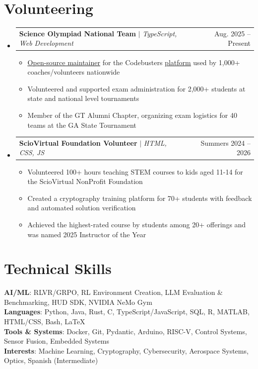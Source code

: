 \documentclass[letterpaper,11pt]{article}
\makeatletter
\newcommand{\resumeItem}[1]{
  \item[--]\small{
    {#1 \vspace{-2pt}}
  }
}
\newcommand{\resumeProjectHeading}[2]{
    \item
    \begin{tabular*}{0.97\textwidth}{l@{\extracolsep{\fill}}r}
      \small#1 & #2 \\
    \end{tabular*}\vspace{-7pt}
}
\newcommand{\resumeSubHeadingListStart}{\begin{itemize}[leftmargin=0.15in, label={}]}
\newcommand{\resumeSubHeadingListEnd}{\end{itemize}}
\newcommand{\resumeItemListStart}{\begin{itemize}}
\newcommand{\resumeItemListEnd}{\end{itemize}\vspace{-5pt}}
\makeatother
\begin{document}
\section{Volunteering}
    \resumeSubHeadingListStart
      \resumeProjectHeading
          {\textbf{Science Olympiad National Team} $|$ \emph{TypeScript, Web Development}}{Aug. 2025 -- Present}
          \resumeItemListStart
            \resumeItem{\href{https://github.com/toebes/ciphers}{\underline{Open-source maintainer}} for the Codebusters \href{https://toebes.com/codebusters/}{\underline{platform}} used by 1,000+ coaches/volunteers nationwide}
            \resumeItem{Volunteered and supported exam administration for 2,000+ students at state and national level tournaments}
            \resumeItem{Member of the GT Alumni Chapter, organizing exam logistics for 40 teams at the GA State Tournament}
          \resumeItemListEnd
      \resumeProjectHeading{\textbf{ScioVirtual Foundation Volunteer} $|$ \emph{HTML, CSS, JS}}{Summers 2024 -- 2026}
      \resumeItemListStart
        \resumeItem{Volunteered 100+ hours teaching STEM courses to kids aged 11-14 for the ScioVirtual NonProfit Foundation}
        \resumeItem{Created a cryptography training platform for 70+ students with feedback and automated solution verification}
        \resumeItem{Achieved the highest-rated course by students among 20+ offerings and was named 2025 Instructor of the Year}
\resumeItemListEnd
\resumeSubHeadingListEnd
%
\section{Technical Skills}
 \begin{itemize}[leftmargin=0.15in, label={}]
    \small{\item{
     \textbf{AI/ML}{: RLVR/GRPO, RL Environment Creation, LLM Evaluation \& Benchmarking, HUD SDK, NVIDIA NeMo Gym} \\
     \textbf{Languages}{: Python, Java, Rust, C, TypeScript/JavaScript, SQL, R, MATLAB, HTML/CSS, Bash, LaTeX} \\
     \textbf{Tools \& Systems}{: Docker, Git, Pydantic, Arduino, RISC-V, Control Systems, Sensor Fusion, Embedded Systems} \\
     \textbf{Interests}{: Machine Learning, Cryptography, Cybersecurity, Aerospace Systems, Optics, Spanish (Intermediate)}
    }}
 \end{itemize}


\end{document}
